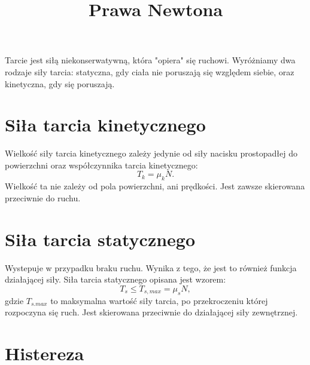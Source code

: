 \documentclass{article}
\title{Prawa Newtona}
\date{}
\begin{document}
\maketitle
Tarcie jest siłą niekonserwatywną, która "opiera" się ruchowi. Wyróżniamy dwa rodzaje siły tarcia: statyczna, gdy ciała nie poruszają się względem siebie, oraz kinetyczna, gdy się poruszają. 
\section{Siła tarcia kinetycznego}
Wielkość siły tarcia kinetycznego zależy jedynie od siły nacisku prostopadłej do powierzchni oraz współczynnika tarcia kinetycznego:
\begin{equation}
T_{k} = \mu_{k} N.
\end{equation}
Wielkość ta nie zależy od pola powierzchni, ani prędkości. Jest zawsze skierowana przeciwnie do ruchu. 

\section{Siła tarcia statycznego}
Wystepuje w przypadku braku ruchu. Wynika z tego, że jest to również funkcja działającej siły. Siła tarcia statycznego opisana jest wzorem:
\begin{equation}
T_{s} \leq T_{s,max} = \mu_{s} N,
\end{equation}
gdzie $T_{s.max}$ to maksymalna wartość siły tarcia, po przekroczeniu której rozpoczyna się ruch. Jest skierowana przeciwnie do działającej siły zewnętrznej.

\section{Histereza}
\end{document}
